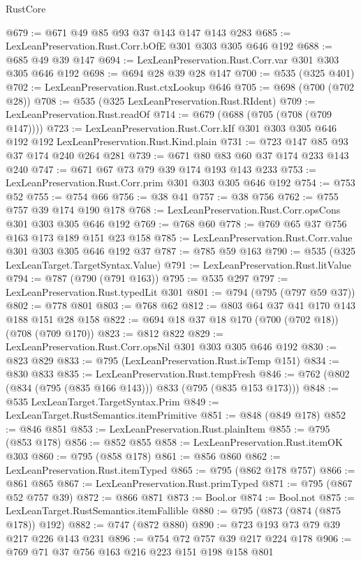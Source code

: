 \begin{lexlean}{RustCore}
\begin{coremodule}
@679 := @671 @49 @85 @93 @37 @143 @147 @143 @283
@685 := LexLeanPreservation.Rust.Corr.bOfE @301 @303 @305 @646 @192
@688 := @685 @49 @39 @147
@694 := LexLeanPreservation.Rust.Corr.var @301 @303 @305 @646 @192
@698 := @694 @28 @39 @28 @147
@700 := @535 (@325 @401)
@702 := LexLeanPreservation.Rust.ctxLookup @646
@705 := @698 (@700 (@702 @28))
@708 := @535 (@325 LexLeanPreservation.Rust.RIdent)
@709 := LexLeanPreservation.Rust.readOf
@714 := @679 (@688 (@705 (@708 (@709 @147))))
@723 := LexLeanPreservation.Rust.Corr.kIf
    @301
    @303
    @305
    @646
    @192
    @192
    LexLeanPreservation.Rust.Kind.plain
@731 := @723 @147 @85 @93 @37 @174 @240 @264 @281
@739 := @671 @80 @83 @60 @37 @174 @233 @143 @240
@747 := @671 @67 @73 @79 @39 @174 @193 @143 @233
@753 := LexLeanPreservation.Rust.Corr.prim @301 @303 @305 @646 @192
@754 := @753 @52
@755 := @754 @66
@756 := @38 @41
@757 := @38 @756
@762 := @755 @757 @39 @174 @190 @178
@768 := LexLeanPreservation.Rust.Corr.opsCons @301 @303 @305 @646 @192
@769 := @768 @60
@778 := @769 @65 @37 @756 @163 @173 @189 @151 @23 @158
@785 := LexLeanPreservation.Rust.Corr.value @301 @303 @305 @646 @192 @37
@787 := @785 @59 @163
@790 := @535 (@325 LexLeanTarget.TargetSyntax.Value)
@791 := LexLeanPreservation.Rust.litValue
@794 := @787 (@790 (@791 @163))
@795 := @535 @297
@797 := LexLeanPreservation.Rust.typedLit @301
@801 := @794 (@795 (@797 @59 @37))
@802 := @778 @801
@803 := @768 @62
@812 := @803 @64 @37 @41 @170 @143 @188 @151 @28 @158
@822 := @694 @18 @37 @18 @170 (@700 (@702 @18)) (@708 (@709 @170))
@823 := @812 @822
@829 := LexLeanPreservation.Rust.Corr.opsNil @301 @303 @305 @646 @192
@830 := @823 @829
@833 := @795 (LexLeanPreservation.Rust.isTemp @151)
@834 := @830 @833
@835 := LexLeanPreservation.Rust.tempFresh
@846 := @762 (@802 (@834 (@795 (@835 @166 @143))) @833 (@795 (@835 @153 @173)))
@848 := @535 LexLeanTarget.TargetSyntax.Prim
@849 := LexLeanTarget.RustSemantics.itemPrimitive
@851 := @848 (@849 @178)
@852 := @846 @851
@853 := LexLeanPreservation.Rust.plainItem
@855 := @795 (@853 @178)
@856 := @852 @855
@858 := LexLeanPreservation.Rust.itemOK @303
@860 := @795 (@858 @178)
@861 := @856 @860
@862 := LexLeanPreservation.Rust.itemTyped
@865 := @795 (@862 @178 @757)
@866 := @861 @865
@867 := LexLeanPreservation.Rust.primTyped
@871 := @795 (@867 @52 @757 @39)
@872 := @866 @871
@873 := Bool.or
@874 := Bool.not
@875 := LexLeanTarget.RustSemantics.itemFallible
@880 := @795 (@873 (@874 (@875 @178)) @192)
@882 := @747 (@872 @880)
@890 := @723 @193 @73 @79 @39 @217 @226 @143 @231
@896 := @754 @72 @757 @39 @217 @224 @178
@906 := @769 @71 @37 @756 @163 @216 @223 @151 @198 @158 @801

\end{coremodule}
\end{lexlean}

